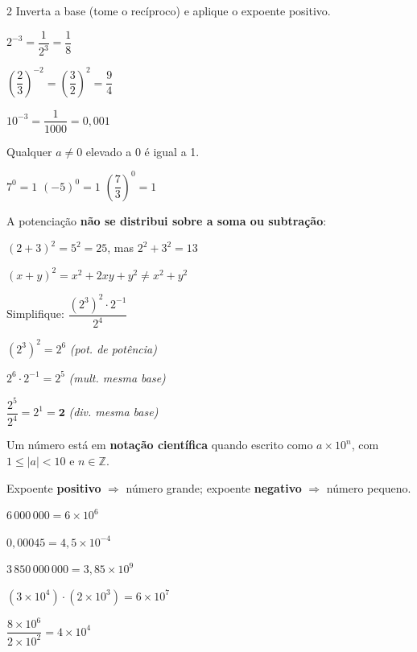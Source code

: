 \documentclass[12pt]{article}
\begin{document}
\begin{multicols}{2}
Inverta a base (tome o recíproco) e aplique o expoente positivo.



$2^{-3} = \dfrac{1}{2^3} = \dfrac{1}{8}$ \vspace{6px}

$\left(\dfrac{2}{3}\right)^{-2} = \left(\dfrac{3}{2}\right)^{2} = \dfrac{9}{4}$ \vspace{6px}

$10^{-3} = \dfrac{1}{1000} = 0{,}001$


Qualquer $a \neq 0$ elevado a $0$ é igual a 1.



$7^0 = 1$ \qquad $(-5)^0 = 1$ \qquad $\left(\dfrac{7}{3}\right)^0 = 1$


A potenciação \textbf{não se distribui sobre a soma ou subtração}:



$(2+3)^2 = 5^2 = 25$, \quad mas $2^2 + 3^2 = 13$ \vspace{6px}

$(x+y)^2 = x^2 + 2xy + y^2 \neq x^2 + y^2$


Simplifique: $\dfrac{(2^3)^2 \cdot 2^{-1}}{2^4}$

$(2^3)^2 = 2^6$ \hfill {\small\textit{(pot. de potência)}}

$2^6 \cdot 2^{-1} = 2^5$ \hfill {\small\textit{(mult. mesma base)}}

$\dfrac{2^5}{2^4} = 2^1 = \mathbf{2}$ \hfill {\small\textit{(div. mesma base)}}


Um número está em \textbf{notação científica} quando escrito como $a \times 10^n$, com $1 \leq |a| < 10$ e $n \in \mathbb{Z}$.

Expoente \textbf{positivo} $\Rightarrow$ número grande; expoente \textbf{negativo} $\Rightarrow$ número pequeno.


$6\,000\,000 = 6 \times 10^6$

$0{,}00045 = 4{,}5 \times 10^{-4}$

$3\,850\,000\,000 = 3{,}85 \times 10^{9}$


$(3 \times 10^4) \cdot (2 \times 10^3) = 6 \times 10^7$ \vspace{6px}

$\dfrac{8 \times 10^6}{2 \times 10^2} = 4 \times 10^4$

\end{multicols}
\end{document}
